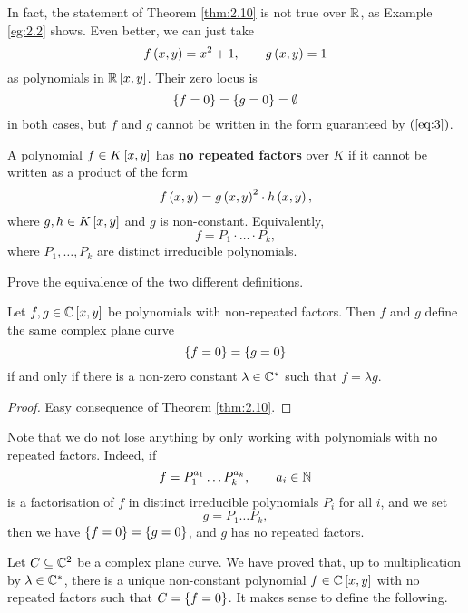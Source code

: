 \begin{remark}
In fact, the statement of Theorem \ref{thm:2.10} is not true over $ \R $, as Example \ref{eg:2.2} shows. Even better, we can just take
$$ f\rb{x, y} = x^2 + 1, \qquad g\rb{x, y} = 1 $$
as polynomials in $ \R\sb{x, y} $. Their zero locus is
$$ \cb{f = 0} = \cb{g = 0} = \emptyset $$
in both cases, but $ f $ and $ g $ cannot be written in the form guaranteed by $ \rb{\ref{eq:3}} $.
\end{remark}

\begin{definition}
A polynomial $ f \in K\sb{x, y} $ has \textbf{no repeated factors} over $ K $ if it cannot be written as a product of the form
$$ f\rb{x, y} = g\rb{x, y}^2 \cdot h\rb{x, y}, $$
where $ g, h \in K\sb{x, y} $ and $ g $ is non-constant. Equivalently,
$$ f = P_1 \cdot \dots \cdot P_k, $$
where $ P_1, \dots, P_k $ are distinct irreducible polynomials.
\end{definition}

\begin{exercise}
Prove the equivalence of the two different definitions.
\end{exercise}

\begin{corollary}
Let $ f, g \in \C\sb{x, y} $ be polynomials with non-repeated factors. Then $ f $ and $ g $ define the same complex plane curve
$$ \cb{f = 0} = \cb{g = 0} $$
if and only if there is a non-zero constant $ \lambda \in \C^* $ such that $ f = \lambda g $.
\end{corollary}

\begin{proof}
Easy consequence of Theorem \ref{thm:2.10}.
\end{proof}

\begin{remark}
Note that we do not lose anything by only working with polynomials with no repeated factors. Indeed, if
$$ f = P_1^{a_1} \dots P_k^{a_k}, \qquad a_i \in \N $$
is a factorisation of $ f $ in distinct irreducible polynomials $ P_i $ for all $ i $, and we set
$$ g = P_1 \dots P_k, $$
then we have $ \cb{f = 0} = \cb{g = 0} $, and $ g $ has no repeated factors.
\end{remark}

Let $ C \subseteq \C^2 $ be a complex plane curve. We have proved that, up to multiplication by $ \lambda \in \C^* $, there is a unique non-constant polynomial $ f \in \C\sb{x, y} $ with no repeated factors such that $ C = \cb{f = 0} $. It makes sense to define the following.

